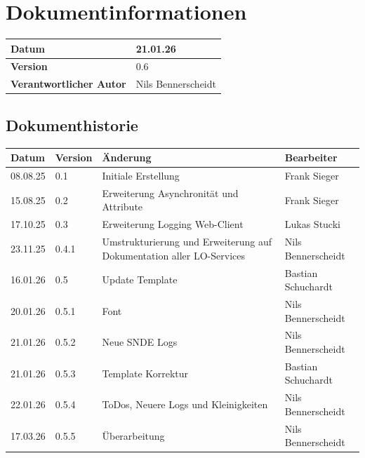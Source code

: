 \tableofcontents

\listoffigures
\listoftables
\lstlistoflistings

\chapter{Dokumentinformationen}

\setcounter{page}{1}

\begin{table}[h]
	\begin{tabularx}{\textwidth}{|l|X|}
		\hline
		\textbf{Datum} & 21.01.26\\
		\hline
		\textbf{Version} & 0.6\\
		\hline 
		\textbf{Verantwortlicher Autor} & Nils Bennerscheidt\\
		\hline 
	\end{tabularx}
	\label{tbl:dokumentinformation}
\end{table}

\section{Dokumenthistorie}

\begin{table}[h]
	\begin{tabularx}{\textwidth}{|X|X|X|X|}
		\hline
		\textbf{Datum} & \textbf{Version} & \textbf{Änderung} & \textbf{Bearbeiter}\\
		\hline
		08.08.25 & 0.1 & Initiale Erstellung & Frank Sieger\\
		\hline
		15.08.25 & 0.2 & Erweiterung Asynchronität und Attribute & Frank Sieger\\
		\hline
		17.10.25 & 0.3 & Erweiterung Logging Web-Client & Lukas Stucki\\
		\hline
		23.11.25 & 0.4.1 & Umstrukturierung und Erweiterung auf Dokumentation aller LO-Services  & Nils Bennerscheidt\\
		\hline
		16.01.26 & 0.5 & Update Template  & Bastian Schuchardt\\
		\hline
		20.01.26 & 0.5.1 & Font   & Nils Bennerscheidt\\
		\hline
		21.01.26 & 0.5.2 & Neue SNDE Logs   & Nils Bennerscheidt\\
		\hline
		21.01.26 & 0.5.3 & Template Korrektur & Bastian Schuchardt \\
		\hline
		22.01.26 & 0.5.4 & ToDos, Neuere Logs und Kleinigkeiten & Nils Bennerscheidt \\
		\hline
		17.03.26 & 0.5.5 & Überarbeitung & Nils Bennerscheidt \\
		\hline
	\end{tabularx}
	\label{tbl:dokumenthistorie}
		
\end{table}

